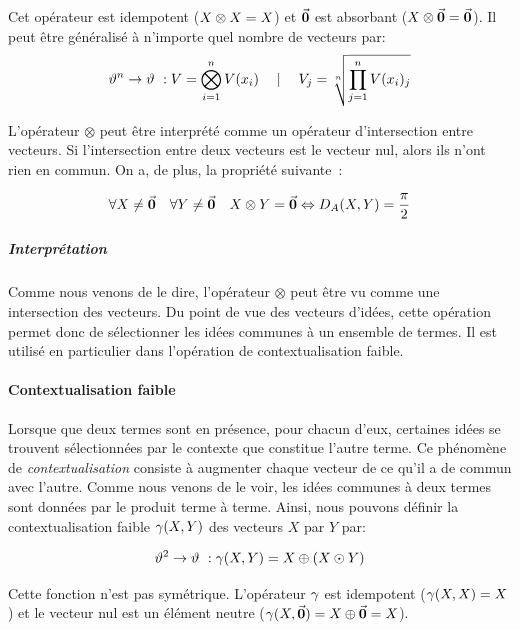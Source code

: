 {Cet opérateur est idempotent (${X \otimes X = X}$) et $\vec{\mathbf{0}}$
est absorbant (${X \otimes \vec{\mathbf{0}} = \vec{\mathbf{0}}}$).  Il peut être
généralisé à n'importe quel nombre de vecteurs par:
\begin{equation}
\vartheta^{n} \rightarrow \vartheta~: V = \bigotimes^{n}_{i=1} V(x_i) \quad  \mid \quad V_j = \sqrt[n]{\prod_{j=1}^{n}V(x_i)_j}
\end{equation}

L'opérateur $\otimes$ peut être interprété comme un opérateur
d'intersection entre vecteurs. Si l'intersection entre deux vecteurs
est le vecteur nul, alors ils n'ont rien en commun. On a, de plus, la
propriété suivante~:

\begin{equation}
\forall X \neq \vec{\mathbf{0}} \quad \forall Y \neq \vec{\mathbf{0}} \quad X \otimes
Y = \vec{\mathbf{0}} \Leftrightarrow D_A(X,Y)=\frac{\pi}{2}
\end{equation}

\subparagraph{Interprétation}

Comme nous venons de le dire, l'opérateur $\otimes$ peut être vu comme
une intersection des vecteurs. Du point de vue des vecteurs
d'idées, cette opération permet donc de
sélectionner les idées communes à un ensemble de termes. Il est
utilisé en particulier dans l'opération de contextualisation faible.

\paragraph{Contextualisation faible} \label{sec:cont-faible}

Lorsque que deux termes sont en présence, pour chacun d'eux, certaines
idées se trouvent sélectionnées par le contexte que constitue l'autre
terme. Ce phénomène de \emph{contextualisation} consiste à augmenter
chaque vecteur de ce qu'il a de commun avec l'autre. Comme nous venons
de le voir, les idées communes à deux termes sont données par le
produit terme à terme. Ainsi, nous pouvons définir la
contextualisation faible $\gamma(X,Y)$ des vecteurs $X$ par $Y$ par:

\begin{equation}
\vartheta^{2} \rightarrow \vartheta~: \gamma(X,Y) = X \oplus (X \odot Y)
\end{equation}

Cette fonction n'est pas symétrique. L'opérateur $\gamma$ est idempotent
($\gamma(X,X) = X$) et le vecteur nul est un élément neutre
($\gamma(X,\vec{\mathbf{0}}) = X \oplus \vec{\mathbf{0}} = X$).

}
